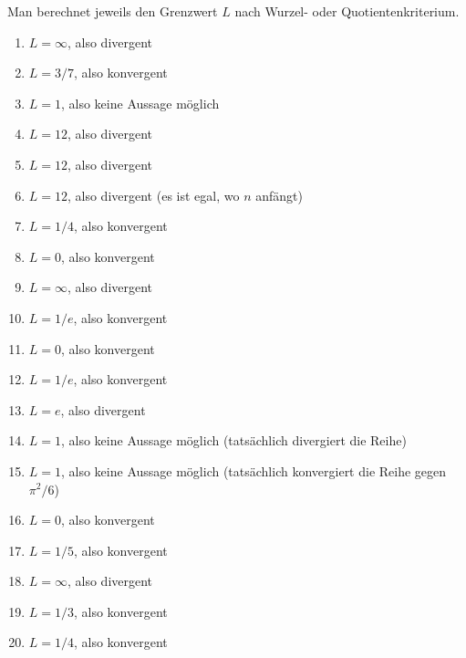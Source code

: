 \item Man berechnet jeweils den Grenzwert $L$ nach Wurzel- oder Quotientenkriterium.


\begin{enumerate}[label=(\arabic*)]
	\item $L=\infty$, also divergent
	\item $L=3/7$, also konvergent
	\item $L=1$, also keine Aussage möglich
	\item $L=12$, also divergent
	\item $L=12$, also divergent
	\item $L=12$, also divergent (es ist egal, wo $n$ anfängt)		
	\item $L=1/4$, also konvergent
	\item $L=0$, also konvergent
	\item $L=\infty$, also divergent
	\item $L=1/e$, also konvergent
	\item $L=0$, also konvergent		
	\item $L=1/e$, also konvergent		
	\item $L=e$, also divergent
	\item $L=1$, also keine Aussage möglich (tatsächlich divergiert die Reihe)
	\item $L=1$, also keine Aussage möglich (tatsächlich konvergiert die Reihe gegen $\pi^2/6$)
	\item $L=0$, also konvergent		
	\item $L=1/5$, also konvergent		
	\item $L=\infty$, also divergent
	\item $L=1/3$, also konvergent
	\item $L=1/4$, also konvergent
\end{enumerate}
